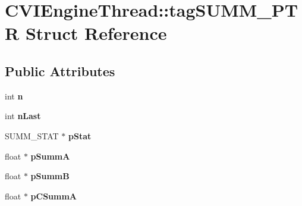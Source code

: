 \hypertarget{struct_c_v_i_engine_thread_1_1tag_s_u_m_m___p_t_r}{\section{C\+V\+I\+Engine\+Thread\+:\+:tag\+S\+U\+M\+M\+\_\+\+P\+T\+R Struct Reference}
\label{struct_c_v_i_engine_thread_1_1tag_s_u_m_m___p_t_r}
}
\subsection*{Public Attributes}
\begin{DoxyCompactItemize}
\item 
\hypertarget{struct_c_v_i_engine_thread_1_1tag_s_u_m_m___p_t_r_ac647af24f7a8fd2e62d4bdc12f4b7465}{int {\bfseries n}}\label{struct_c_v_i_engine_thread_1_1tag_s_u_m_m___p_t_r_ac647af24f7a8fd2e62d4bdc12f4b7465}

\item 
\hypertarget{struct_c_v_i_engine_thread_1_1tag_s_u_m_m___p_t_r_a8091fef3aa3c1fc0f290a6a37c8183f0}{int {\bfseries n\+Last}}\label{struct_c_v_i_engine_thread_1_1tag_s_u_m_m___p_t_r_a8091fef3aa3c1fc0f290a6a37c8183f0}

\item 
\hypertarget{struct_c_v_i_engine_thread_1_1tag_s_u_m_m___p_t_r_a6191d3122464142f39ce9f4915bab62d}{S\+U\+M\+M\+\_\+\+S\+T\+A\+T $\ast$ {\bfseries p\+Stat}}\label{struct_c_v_i_engine_thread_1_1tag_s_u_m_m___p_t_r_a6191d3122464142f39ce9f4915bab62d}

\item 
\hypertarget{struct_c_v_i_engine_thread_1_1tag_s_u_m_m___p_t_r_a126884c9b05358fd2bbcf2dbde7c242a}{float $\ast$ {\bfseries p\+Summ\+A}}\label{struct_c_v_i_engine_thread_1_1tag_s_u_m_m___p_t_r_a126884c9b05358fd2bbcf2dbde7c242a}

\item 
\hypertarget{struct_c_v_i_engine_thread_1_1tag_s_u_m_m___p_t_r_a3ab7ca61e3ade712b4237db5895d8a88}{float $\ast$ {\bfseries p\+Summ\+B}}\label{struct_c_v_i_engine_thread_1_1tag_s_u_m_m___p_t_r_a3ab7ca61e3ade712b4237db5895d8a88}

\item 
\hypertarget{struct_c_v_i_engine_thread_1_1tag_s_u_m_m___p_t_r_a871f6a62c19fe2662b61acef3c5e1f0b}{float $\ast$ {\bfseries p\+C\+Summ\+A}}\label{struct_c_v_i_engine_thread_1_1tag_s_u_m_m___p_t_r_a871f6a62c19fe2662b61acef3c5e1f0b}


\end{DoxyCompactItemize}
